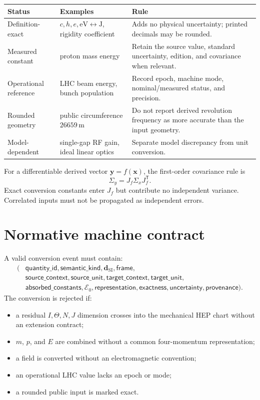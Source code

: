 \documentclass[11pt,a4paper]{article}
\theoremstyle{definition}
\theoremstyle{plain}
\theoremstyle{remark}
\newcommand{\Ezero}{\mathcal E_0}
\newcommand{\SI}{\mathrm{SI}}
\begin{document}
\begin{longtable}{@{}L{38mm}L{50mm}L{59mm}@{}}
\toprule
Status & Examples & Rule \\
\midrule
\endhead
Definition-exact &
\(c,h,e,\mathrm{eV}\leftrightarrow\mathrm J\),
rigidity coefficient &
Adds no physical uncertainty; printed decimals may be rounded. \\
Measured constant &
proton mass energy &
Retain the source value, standard uncertainty, edition, and covariance
when relevant. \\
Operational reference &
LHC beam energy, bunch population &
Record epoch, machine mode, nominal/measured status, and precision. \\
Rounded geometry &
public circumference \(26659\,\mathrm m\) &
Do not report derived revolution frequency as more accurate than the
input geometry. \\
Model-dependent &
single-gap RF gain, ideal linear optics &
Separate model discrepancy from unit conversion. \\
\bottomrule
\end{longtable}

For a differentiable derived vector \(\bm y=f(\bm x)\), the first-order
covariance rule is
\[
\Sigma_y=J_f\Sigma_xJ_f^{\mathsf T}.
\]
Exact conversion constants enter \(J_f\) but contribute no independent
variance. Correlated inputs must not be propagated as independent
errors.

\section{Normative machine contract}

A valid conversion event must contain:
\[
\begin{aligned}
(&\mathsf{quantity\_id},\mathsf{semantic\_kind},
\bm d_{\SI},\mathsf{frame},\\
 &\mathsf{source\_context},\mathsf{source\_unit},
\mathsf{target\_context},\mathsf{target\_unit},\\
 &\mathsf{absorbed\_constants},\Ezero,
\mathsf{representation},\mathsf{exactness},
\mathsf{uncertainty},\mathsf{provenance}).
\end{aligned}
\]
The conversion is rejected if:
\begin{itemize}
  \item a residual \(I,\Theta,N,J\) dimension crosses into the mechanical
  HEP chart without an extension contract;
  \item \(m\), \(p\), and \(E\) are combined without a common
  four-momentum representation;
  \item a field is converted without an electromagnetic convention;
  \item an operational LHC value lacks an epoch or mode;
  \item a rounded public input is marked exact.
\end{itemize}
\end{document}

